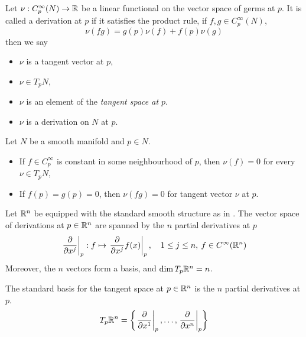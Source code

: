 \documentclass[../main-manifolds.tex]{subfiles}
\begin{document}
\begin{definition}\label{lee-chp3:vector-space-of-derivations-at-p}
    Let $\nu: C_p^\infty(N)\to\mathbb{R}$ be a linear functional on the vector space of germs at $p$. It is called a derivation at $p$ if it satisfies the product rule, if $f,g\in C_p^\infty(N)$, 
    \[
        \nu(fg)=g(p)\nu(f)+f(p)\nu(g)
    \]
    then we say 
    \begin{itemize}
        \item $\nu$ is a tangent vector at $p$, 
        \item $\nu\in T_p N$,
        \item $\nu$ is an element of the \emph{tangent space at $p$}.
        \item $\nu$ is a derivation on $N$ at $p$.
    \end{itemize}
\end{definition}
\begin{wts}
    Let $N$ be a smooth manifold and $p\in N$.
    \begin{itemize}
        \item If $f\in C^\infty_p$ is constant in some neighbourhood of $p$, then $\nu(f)=0$ for every $\nu\in T_pN$,
        \item If $f(p)=g(p)=0$, then $\nu(fg)=0$ for tangent vector $\nu$ at $p$.
    \end{itemize}
\end{wts}


\begin{wts}
    Let ${\mathbb{R}^n}$ be equipped with the standard smooth structure as in . The vector space of derivations at $p\in{\mathbb{R}^n}$ are spanned by the $n$ partial derivatives at $p$
    \[
        \eval{\pdv{x^j}}_{p}:f\mapsto \eval{\pdv{x^j}f(x)}_{p},\quad 1\leq j\leq n,\: f\in \cinf[\realn]
    \]
    Moreover, the $n$ vectors form a basis, and $\operatorname{dim} T_p{\mathbb{R}^n}= n$.
\end{wts}
\begin{definition}
    The standard basis for the tangent space at $p\in{\mathbb{R}^n}$ is the $n$ partial derivatives at $p$.
    \begin{equation}\label{lee-chp3:standard-basis-for-tangent-space-realn}
        T_p\realn = \bigset{\eval{\pdv{x^1}}_{p},\ldots,\eval{\pdv{x^n}}_{p}}
    \end{equation}
\end{definition}
\end{document}

